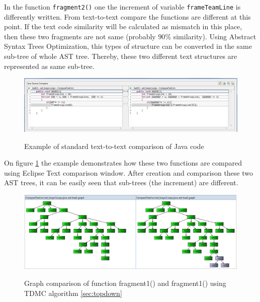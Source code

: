 \documentclass{report}
\begin{document}
In the function \texttt{fragment2()} one the increment of variable \texttt{frameTeamLine} is differently written. From text-to-text compare the functions are different at this point. If the text code similarity will be calculated as mismatch in this place, then these two fragments are not same (probably $90\%$ similarity). Using Abstract Syntax Trees Optimization, this types of structure can be converted in the same sub-tree of whole AST tree. Thereby, these two different text structures are represented as same sub-tree. 

\vspace{4mm}

\begin{figure}[h]
  \centering
  \includegraphics[width=1.00\textwidth]{Figures/AST-optimization/text-to-text-compare}\\[0.1cm]
  \caption[Text to text comparison example]{Example of standard text-to-text comparison of Java code}
  \label{fig:text-to-text-compare}
\end{figure}

On figure \ref{fig:text-to-text-compare} the example demonstrates how these two functions are compared using Eclipse Text comparison window. After creation and comparison these two AST trees, it can be easily seen that sub-trees (the increment) are different.

\begin{figure}[h]
  \centering
  \includegraphics[width=1.00\textwidth]{Figures/AST-optimization/tree-compared1}\\[0.1cm]
  \caption[Graph comparison on similar AST trees]{Graph comparison of function fragment1() and fragment1() using TDMC algorithm \ref{sec:topdown}}
  \label{fig:ast-graph-compare-similar-tdmc}
\end{figure}
\end{document}
